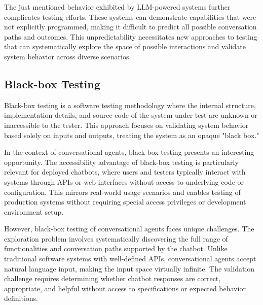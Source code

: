 The just mentioned behavior exhibited by \ac{LLM}-powered systems
further complicates testing efforts.
These systems can demonstrate capabilities that were not explicitly programmed,
making it difficult to predict all possible conversation paths and outcomes.
This unpredictability necessitates new approaches to testing
that can systematically explore the space of possible interactions
and validate system behavior across diverse scenarios.

\subsection{Black-box Testing}

Black-box testing is a software testing methodology
where the internal structure, implementation details, and source code of the system under test
are unknown or inaccessible to the tester.
This approach focuses on validating system behavior based solely on inputs and outputs,
treating the system as an opaque "black box."

In the context of conversational agents,
black-box testing presents an interesting opportunity.
The accessibility advantage of black-box testing
is particularly relevant for deployed chatbots,
where users and testers typically interact with systems
through APIs or web interfaces without access to underlying code or configuration.
This mirrors real-world usage scenarios
and enables testing of production systems
without requiring special access privileges or development environment setup.


However, black-box testing of conversational agents faces unique challenges.
The exploration problem involves
systematically discovering the full range of functionalities
and conversation paths supported by the chatbot.
Unlike traditional software systems with well-defined APIs,
conversational agents accept natural language input,
making the input space virtually infinite.
The validation challenge requires determining
whether chatbot responses are correct, appropriate, and helpful
without access to specifications or expected behavior definitions.
